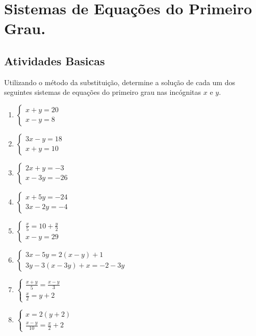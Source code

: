 \chapter{Sistemas de Equações do Primeiro Grau.}

\section{Atividades Basicas}
	
	
	\item Utilizando o método da substituição, determine a solução de cada um dos seguintes sistemas de equações do primeiro grau nas incógnitas $x$ e $y$.
	\begin{multicols}{2}	
	\begin{enumerate}
		\item $\begin{cases}	x+y=20\\ x-y=8\end{cases}$
		\item $\begin{cases}	3x-y=18\\x+y=10\end{cases}$
		\item $\begin{cases} 2x+y=-3\\ x-3y=-26\end{cases}$
		\item $\begin{cases}	x+5y=-24\\ 3x-2y=-4\end{cases}$
		\item $\begin{cases}	\displaystyle\frac{x}{5}=10+\frac{y}{2}\\ x-y=29\end{cases}$
		\item $\begin{cases} 3x-5y=2(x-y)+1\\ 3y-3(x-3y)+x=-2-3y\end{cases}$
		\item $\begin{cases}	\displaystyle\frac{x+y}{5}=\frac{x-y}{3}\\ \displaystyle\frac{x}{2}=y+2  \end{cases}$
		\item $\begin{cases}	x=2(y+2)\\ \displaystyle\frac{x-y}{10}=\frac{x}{2}+2\end{cases}$
	\end{enumerate}
	\end{multicols}
	
